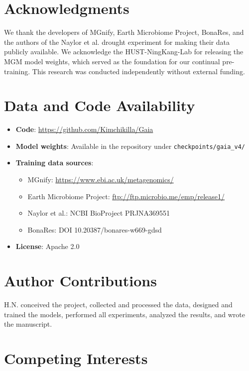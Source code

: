 \documentclass[11pt,a4paper]{article}
\begin{document}
\section*{Acknowledgments}

We thank the developers of MGnify, Earth Microbiome Project, BonaRes, and the authors of the Naylor et al. drought experiment for making their data publicly available. We acknowledge the HUST-NingKang-Lab for releasing the MGM model weights, which served as the foundation for our continual pre-training. This research was conducted independently without external funding.

\section*{Data and Code Availability}

\begin{itemize}[leftmargin=1.5em]
    \item \textbf{Code}: \url{https://github.com/Kimchikilla/Gaia}
    \item \textbf{Model weights}: Available in the repository under \texttt{checkpoints/gaia\_v4/}
    \item \textbf{Training data sources}:
    \begin{itemize}
        \item MGnify: \url{https://www.ebi.ac.uk/metagenomics/}
        \item Earth Microbiome Project: \url{ftp://ftp.microbio.me/emp/release1/}
        \item Naylor et al.: NCBI BioProject PRJNA369551
        \item BonaRes: DOI 10.20387/bonares-w669-gdsd
    \end{itemize}
    \item \textbf{License}: Apache 2.0
\end{itemize}

\section*{Author Contributions}

H.N. conceived the project, collected and processed the data, designed and trained the models, performed all experiments, analyzed the results, and wrote the manuscript.

\section*{Competing Interests}
\end{document}
